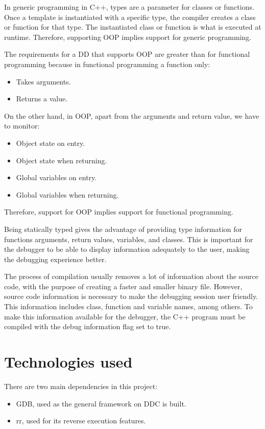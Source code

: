 In generic programming in C++, types are a parameter for classes or functions.
Once a template is instantiated with a specific type, the compiler creates a class or function for that type.
The instantiated class or function is what is executed at runtime. Therefore, supporting OOP implies support for generic programming.

The requirements for a DD that supports OOP are greater than for functional programming because in functional programming a function only:
\begin{itemize}
    \item Takes arguments.
    \item Returns a value.
\end{itemize}
On the other hand, in OOP, apart from the arguments and return value, we have to monitor:
\begin{itemize}
    \item Object state on entry.
    \item Object state when returning.
    \item Global variables on entry.
    \item Global variables when returning.
\end{itemize}
Therefore, support for OOP implies support for functional programming.

Being statically typed gives the advantage of providing type information for functions arguments, return values, variables, and classes. This is important for the debugger to be able to display information adequately to the user, making the debugging experience better.

The process of compilation usually removes a lot of information about the source code, with the purpose of creating a faster and smaller binary file.
However, source code information is necessary to make the debugging session user friendly. This information includes class, function and variable names, among others.
To make this information available for the debugger, the C++ program must be compiled with the debug information flag set to true.

\section{Technologies used}
There are two main dependencies in this project:
\begin{itemize}
    \item GDB, used as the general framework on DDC is built.
    \item rr, used for its reverse execution features.
\end{itemize}

